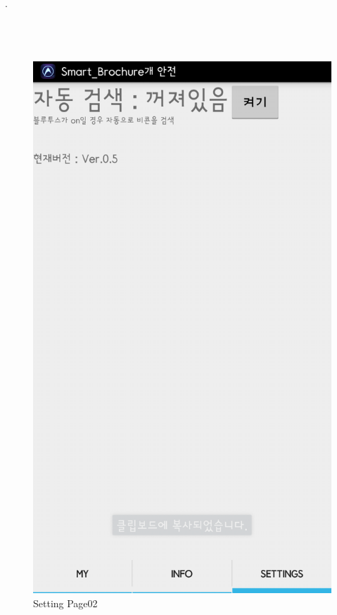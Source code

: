 \documentclass[conference]{IEEEtran}
\begin{document}
.\\\\\\\\

\begin{figure}[htbp]
\begin{center}
    \includegraphics[scale=0.2]{img_capture10}
    \caption{Setting Page02} 
\end{center}
\end{figure}
\end{document}
